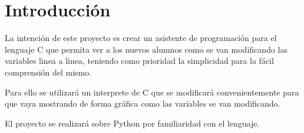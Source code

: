 \chapter{Introducción}

La  intención  de  este  proyecto  es  crear  un  asistente  de  programación para  el lenguaje C que permita ver a los nuevos alumnos como se van modificando las variables linea a linea, teniendo como prioridad la simplicidad para la fácil comprensión del mismo.

Para ello se utilizará un interprete de C que se modificará convenientemente para que vaya mostrando de forma gráfica como las variables se van modificando.

El proyecto se realizará sobre Python por familiaridad con el lenguaje.